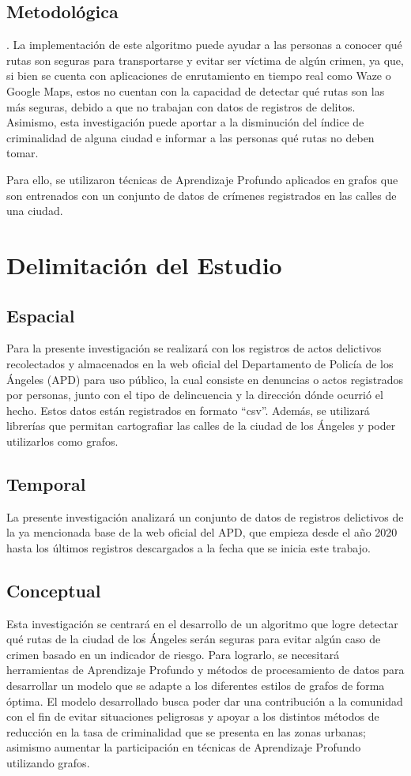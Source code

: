 \subsection{Metodológica}. 
La implementación de este algoritmo puede ayudar a las personas a conocer qué rutas son seguras para transportarse y evitar ser víctima de algún crimen, ya que, si bien se cuenta con aplicaciones de enrutamiento en tiempo real como Waze o Google Maps, estos no cuentan con la capacidad de detectar qué rutas son las más seguras, debido a que no trabajan con datos de registros de delitos. Asimismo, esta investigación puede aportar a la disminución del índice de criminalidad de alguna ciudad e informar a las personas qué rutas no deben tomar.

Para ello, se utilizaron técnicas de Aprendizaje Profundo aplicados en grafos que son entrenados con un conjunto de datos de crímenes registrados en las calles de una ciudad.

\section{Delimitación del Estudio}

\subsection{Espacial}
Para la presente investigación se realizará con los registros de actos delictivos recolectados y almacenados en la web oficial del Departamento de Policía de los Ángeles (APD) para uso público, la cual consiste en denuncias o actos registrados por personas, junto con el tipo de delincuencia y la dirección dónde ocurrió el hecho. Estos datos están registrados en formato “csv”. Además, se utilizará librerías que permitan cartografiar las calles de la ciudad de los Ángeles y poder utilizarlos como grafos.
\subsection{Temporal}
La presente investigación analizará un conjunto de datos de registros delictivos de la ya mencionada base de la web oficial del APD, que empieza desde el año 2020 hasta los últimos registros descargados a la fecha que se inicia este trabajo.

\subsection{Conceptual}
Esta investigación se centrará en el desarrollo de un algoritmo que logre detectar qué rutas de la ciudad de los Ángeles serán seguras para evitar algún caso de crimen basado en un indicador de riesgo. Para lograrlo, se necesitará herramientas de Aprendizaje Profundo y métodos de procesamiento de datos para desarrollar un modelo que se adapte a los diferentes estilos de grafos de forma óptima. El modelo desarrollado busca poder dar una contribución a la comunidad con el fin de evitar situaciones peligrosas y apoyar a los distintos métodos de reducción en la tasa de criminalidad que se presenta en las zonas urbanas; asimismo aumentar la participación en técnicas de Aprendizaje Profundo utilizando grafos. 

